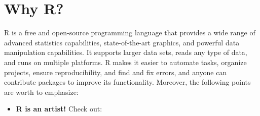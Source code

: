 \documentclass[
  12pt,
  oneside]{book}
\providecommand{\tightlist}{%
  \setlength{\itemsep}{0pt}\setlength{\parskip}{0pt}}
\theoremstyle{definition}
\theoremstyle{definition}
\theoremstyle{definition}
\theoremstyle{definition}
\theoremstyle{remark}
\begin{document}
\hypertarget{sec:whyR}{%
\section{Why R?}\label{sec:whyR}}

R is a free and open-source programming language that provides a wide range of advanced statistics capabilities, state-of-the-art graphics, and powerful data manipulation capabilities. It supports larger data sets, reads any type of data, and runs on multiple platforms. R makes it easier to automate tasks, organize projects, ensure reproducibility, and find and fix errors, and anyone can contribute packages to improve its functionality. Moreover, the following points are worth to emphasize:

\begin{itemize}
\tightlist
\item
  \textbf{R is an artist!} Check out:


\end{itemize}
\end{document}
